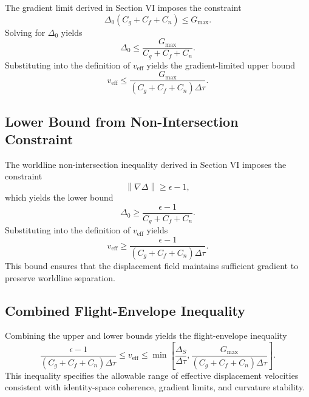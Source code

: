 \documentclass[aip,adv,reprint,floatfix]{revtex4-2}
\begin{document}
The gradient limit derived in Section VI imposes the constraint
\begin{equation}
\Delta_0 \left( C_g + C_f + C_n \right) \leq G_{\max}.
\end{equation}
Solving for $\Delta_0$ yields
\begin{equation}
\Delta_0 \leq \frac{G_{\max}}{C_g + C_f + C_n}.
\end{equation}
Substituting into the definition of $v_{\mathrm{eff}}$ yields the gradient-limited upper bound
\begin{equation}
v_{\mathrm{eff}} \leq \frac{G_{\max}}{(C_g + C_f + C_n)\Delta \tau}.
\end{equation}

\subsection{Lower Bound from Non-Intersection Constraint}

The worldline non-intersection inequality derived in Section VI imposes the constraint
\begin{equation}
\left\| \nabla \Delta \right\| \geq \epsilon - 1,
\end{equation}
which yields the lower bound
\begin{equation}
\Delta_0 \geq \frac{\epsilon - 1}{C_g + C_f + C_n}.
\end{equation}
Substituting into the definition of $v_{\mathrm{eff}}$ yields
\begin{equation}
v_{\mathrm{eff}} \geq \frac{\epsilon - 1}{(C_g + C_f + C_n)\Delta \tau}.
\end{equation}
This bound ensures that the displacement field maintains sufficient gradient to preserve worldline separation.

\subsection{Combined Flight-Envelope Inequality}

Combining the upper and lower bounds yields the flight-envelope inequality
\begin{equation}
\frac{\epsilon - 1}{(C_g + C_f + C_n)\Delta \tau}
\leq
v_{\mathrm{eff}}
\leq
\min\left[
\frac{\Delta_S}{\Delta \tau},
\frac{G_{\max}}{(C_g + C_f + C_n)\Delta \tau}
\right].
\end{equation}
This inequality specifies the allowable range of effective displacement velocities consistent with identity-space coherence, gradient limits, and curvature stability.
\end{document}
